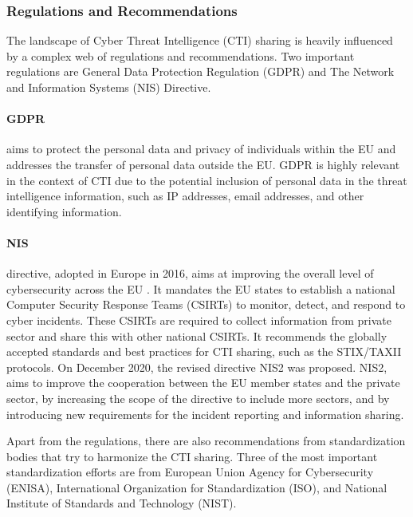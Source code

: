 \subsubsection{Regulations and Recommendations}
\label{subsubsec:regulations}
The landscape of Cyber Threat Intelligence (CTI) sharing is heavily influenced by a complex web of regulations and recommendations. Two important regulations are General Data Protection Regulation (GDPR) and The Network and Information Systems (NIS) Directive. 

\paragraph{GDPR} aims to protect the personal data and privacy of individuals within the EU and addresses the transfer of personal data outside the EU. GDPR is highly relevant in the context of CTI due to the potential inclusion of personal data in the threat intelligence information, such as IP addresses, email addresses, and other identifying information. 

\paragraph{NIS} directive, adopted in Europe in 2016, aims at improving the overall level of cybersecurity across the EU \cite{nis_directive}. It mandates the EU states to establish a national Computer Security Response Teams (CSIRTs) to monitor, detect, and respond to cyber incidents. These CSIRTs are required to collect information from private sector and share this with other national CSIRTs. It recommends the globally accepted standards and best practices for CTI sharing, such as the STIX/TAXII protocols. On December 2020, the revised directive NIS2 was proposed. NIS2, aims to improve the cooperation between the EU member states and the private sector, by increasing the scope of the directive to include more sectors, and by introducing new requirements for the incident reporting and information sharing.

Apart from the regulations, there are also recommendations from standardization bodies that try to harmonize the CTI sharing. Three of the most important standardization efforts are from European Union Agency for Cybersecurity (ENISA), International Organization for Standardization (ISO), and National Institute of Standards and Technology (NIST).


